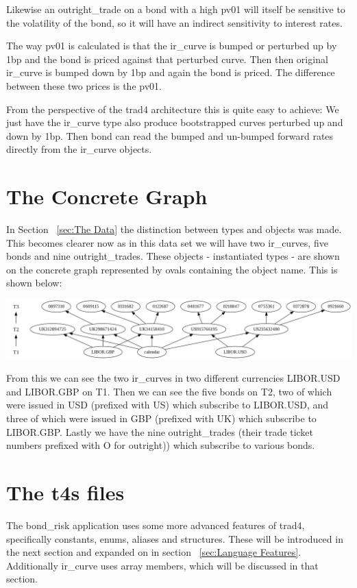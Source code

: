 \documentclass{report}
\begin{document}
Likewise an outright_trade on a bond with a high pv01 will itself be sensitive to the volatility of the bond, so it will have an indirect sensitivity to interest rates.

The way pv01 is calculated is that the ir_curve is bumped or perturbed up by 1bp and the bond is priced against that perturbed curve. Then then original ir_curve is bumped down by 1bp and again the bond is priced. The difference between these two prices is the pv01.

From the perspective of the trad4 architecture this is quite easy to achieve: We just have the ir_curve type also produce bootstrapped curves perturbed up and down by 1bp. Then bond can read the bumped and un-bumped forward rates directly from the ir_curve objects. 

\section{The Concrete Graph}

In Section ~\ref{sec:The Data} the distinction between types and objects was made. This becomes clearer now as in this data set we will have two ir_curves, five bonds and nine outright_trades. These objects - instantiated types - are shown on the concrete graph represented by ovals containing the object name. This is shown below:

\includegraphics[scale=0.25]{bondrisksimpleconcrete.png}

From this we can see the two ir_curves in two different currencies LIBOR.USD and LIBOR.GBP on T1. Then we can see the five bonds on T2, two of which were issued in USD (prefixed with US) which subscribe to LIBOR.USD, and three of which were issued in GBP (prefixed with UK) which subscribe to LIBOR.GBP. Lastly we have the nine outright_trades (their trade ticket numbers prefixed with O for outright)) which subscribe to various bonds.

\section{The t4s files}

The bond_risk application uses some more advanced features of trad4, specifically constants, enums, aliases and structures. These will be introduced in the next section and expanded on in section ~\ref{sec:Language Features}. Additionally ir_curve uses array members, which will be discussed in that section.
\end{document}
